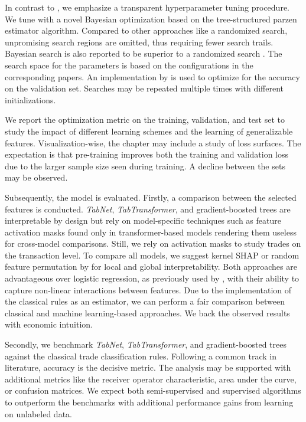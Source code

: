 In contrast to \textcite{ronenMachineLearningTrade2022}, we emphasize a transparent hyperparameter tuning procedure. We tune with a novel Bayesian optimization based on the tree-structured parzen estimator algorithm. Compared to other approaches like a randomized search, unpromising search regions are omitted, thus requiring fewer search trails. Bayesian search is also reported to be superior to a randomized search \autocite{turnerBayesianOptimizationSuperior2021}. The search space for the parameters is based on the configurations in the corresponding papers. An implementation by \textcite{akibaOptunaNextgenerationHyperparameter2019} is used to optimize for the accuracy on the validation set. Searches may be repeated multiple times with different initializations.

We report the optimization metric on the training, validation, and test set to study the impact of different learning schemes and the learning of generalizable features. Visualization-wise, the chapter may include a study of loss surfaces. The expectation is that pre-training improves both the training and validation loss due to the larger sample size seen during training. A decline between the sets may be observed.

Subsequently, the model is evaluated. Firstly, a comparison between the selected features is conducted. \emph{TabNet}, \emph{TabTransformer}, and gradient-boosted trees are interpretable by design but rely on model-specific techniques such as feature activation masks found only in transformer-based models rendering them useless for cross-model comparisons. Still, we rely on activation masks to study trades on the transaction level. To compare all models, we suggest kernel \gls{SHAP} \autocite{lundbergUnifiedApproachInterpreting2017} or random feature permutation by \textcite{breimanRandomForests2001} for local and global interpretability. Both approaches are advantageous over logistic regression, as previously used by \textcites{savickasInferringDirectionOption2003}{chakrabartyTradeClassificationAlgorithms2012}, with their ability to capture non-linear interactions between features. Due to the implementation of the classical rules as an estimator, we can perform a fair comparison between classical and machine learning-based approaches. We back the observed results with economic intuition.

Secondly, we benchmark \emph{TabNet}, \emph{TabTransformer}, and gradient-boosted trees against the classical trade classification rules. Following a common track in literature, accuracy is the decisive metric. The analysis may be supported with additional metrics like the receiver operator characteristic, area under the curve, or confusion matrices. We expect both semi-supervised and supervised algorithms to outperform the benchmarks with additional performance gains from learning on unlabeled data.

